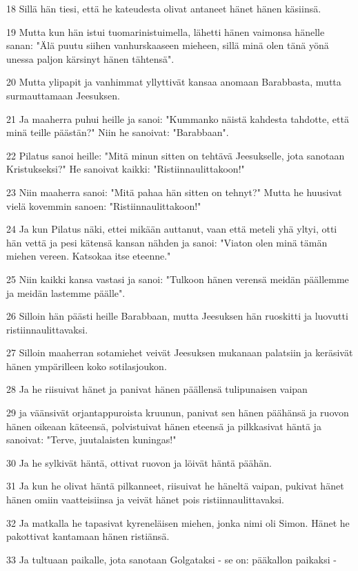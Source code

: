 \par 18 Sillä hän tiesi, että he kateudesta olivat antaneet hänet hänen käsiinsä.
\par 19 Mutta kun hän istui tuomarinistuimella, lähetti hänen vaimonsa hänelle sanan: "Älä puutu siihen vanhurskaaseen mieheen, sillä minä olen tänä yönä unessa paljon kärsinyt hänen tähtensä".
\par 20 Mutta ylipapit ja vanhimmat yllyttivät kansaa anomaan Barabbasta, mutta surmauttamaan Jeesuksen.
\par 21 Ja maaherra puhui heille ja sanoi: "Kummanko näistä kahdesta tahdotte, että minä teille päästän?" Niin he sanoivat: "Barabbaan".
\par 22 Pilatus sanoi heille: "Mitä minun sitten on tehtävä Jeesukselle, jota sanotaan Kristukseksi?" He sanoivat kaikki: "Ristiinnaulittakoon!"
\par 23 Niin maaherra sanoi: "Mitä pahaa hän sitten on tehnyt?" Mutta he huusivat vielä kovemmin sanoen: "Ristiinnaulittakoon!"
\par 24 Ja kun Pilatus näki, ettei mikään auttanut, vaan että meteli yhä yltyi, otti hän vettä ja pesi kätensä kansan nähden ja sanoi: "Viaton olen minä tämän miehen vereen. Katsokaa itse eteenne."
\par 25 Niin kaikki kansa vastasi ja sanoi: "Tulkoon hänen verensä meidän päällemme ja meidän lastemme päälle".
\par 26 Silloin hän päästi heille Barabbaan, mutta Jeesuksen hän ruoskitti ja luovutti ristiinnaulittavaksi.
\par 27 Silloin maaherran sotamiehet veivät Jeesuksen mukanaan palatsiin ja keräsivät hänen ympärilleen koko sotilasjoukon.
\par 28 Ja he riisuivat hänet ja panivat hänen päällensä tulipunaisen vaipan
\par 29 ja väänsivät orjantappuroista kruunun, panivat sen hänen päähänsä ja ruovon hänen oikeaan käteensä, polvistuivat hänen eteensä ja pilkkasivat häntä ja sanoivat: "Terve, juutalaisten kuningas!"
\par 30 Ja he sylkivät häntä, ottivat ruovon ja löivät häntä päähän.
\par 31 Ja kun he olivat häntä pilkanneet, riisuivat he häneltä vaipan, pukivat hänet hänen omiin vaatteisiinsa ja veivät hänet pois ristiinnaulittavaksi.
\par 32 Ja matkalla he tapasivat kyreneläisen miehen, jonka nimi oli Simon. Hänet he pakottivat kantamaan hänen ristiänsä.
\par 33 Ja tultuaan paikalle, jota sanotaan Golgataksi - se on: pääkallon paikaksi -
